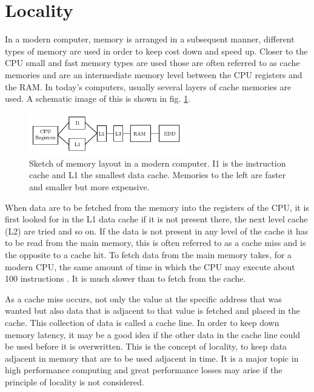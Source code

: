 \section{Locality}
In a modern computer, memory is arranged in a subsequent manner,
different types of memory are used in order to keep cost down and
speed up. Closer to the CPU small and fast memory types are used those
are often referred to as cache memories and are an intermediate memory
level between the CPU registers and the RAM. In today's computers,
usually several layers of cache memories are used. A schematic image
of this is shown in fig. \ref{fig:hpc:mem}.

\begin{figure}
\begin{center}
\includegraphics[width=0.6\textwidth]{fig/mem.pdf}
\end{center}
\caption[Sketch of memory layout in a modern computer.]{Sketch of
  memory layout in a modern computer. I1 is the instruction cache and
  L1 the smallest data cache. Memories to the left are faster and
  smaller but more expensive. }
\label{fig:hpc:mem}
\end{figure}

When data are to be fetched from the memory into the registers of the
CPU, it is first looked for in the L1 data cache if it is not present
there, the next level cache (L2) are tried and so on. If the data is
not present in any level of the cache it has to be read from the main
memory, this is often referred to as a cache miss and is the opposite
to a cache hit. To fetch data from the main memory takes, for a modern
CPU, the same amount of time in which the CPU may execute about 100
instructions \cite{wiki-mem}. It is much slower than to fetch from the
cache.

As a cache miss occurs, not only the value at the specific address
that was wanted but also data that is adjacent to that value is
fetched and placed in the cache. This collection of data is called a
cache line. In order to keep down memory latency, it may be a good
idea if the other data in the cache line could be used before it is
overwritten. This is the concept of locality, to keep data adjacent in
memory that are to be used adjacent in time. It is a major topic in
high performance computing and great performance losses may arise if
the principle of locality is not considered.

